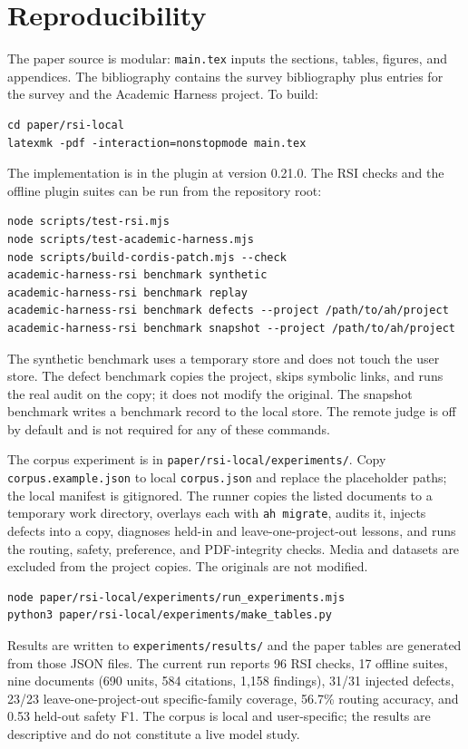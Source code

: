 \section{Reproducibility}
\label{app:reproducibility}

The paper source is modular: \texttt{main.tex} inputs the sections, tables, figures, and appendices. The bibliography contains the survey bibliography plus entries for the survey and the Academic Harness project. To build:

\begin{verbatim}
cd paper/rsi-local
latexmk -pdf -interaction=nonstopmode main.tex
\end{verbatim}

The implementation is in the plugin at version 0.21.0. The RSI checks and the offline plugin suites can be run from the repository root:

\begin{verbatim}
node scripts/test-rsi.mjs
node scripts/test-academic-harness.mjs
node scripts/build-cordis-patch.mjs --check
academic-harness-rsi benchmark synthetic
academic-harness-rsi benchmark replay
academic-harness-rsi benchmark defects --project /path/to/ah/project
academic-harness-rsi benchmark snapshot --project /path/to/ah/project
\end{verbatim}

The synthetic benchmark uses a temporary store and does not touch the user store. The defect benchmark copies the project, skips symbolic links, and runs the real audit on the copy; it does not modify the original. The snapshot benchmark writes a benchmark record to the local store. The remote judge is off by default and is not required for any of these commands.

The corpus experiment is in \texttt{paper/rsi-local/experiments/}. Copy \texttt{corpus.example.json} to local \texttt{corpus.json} and replace the placeholder paths; the local manifest is gitignored. The runner copies the listed documents to a temporary work directory, overlays each with \texttt{ah migrate}, audits it, injects defects into a copy, diagnoses held-in and leave-one-project-out lessons, and runs the routing, safety, preference, and PDF-integrity checks. Media and datasets are excluded from the project copies. The originals are not modified.

\begin{verbatim}
node paper/rsi-local/experiments/run_experiments.mjs
python3 paper/rsi-local/experiments/make_tables.py
\end{verbatim}

Results are written to \texttt{experiments/results/} and the paper tables are generated from those JSON files. The current run reports 96 RSI checks, 17 offline suites, nine documents (690 units, 584 citations, 1,158 findings), 31/31 injected defects, 23/23 leave-one-project-out specific-family coverage, 56.7\% routing accuracy, and 0.53 held-out safety F1. The corpus is local and user-specific; the results are descriptive and do not constitute a live model study.
